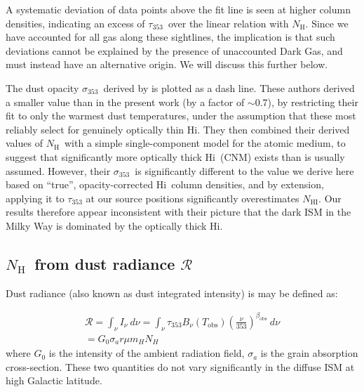 \documentclass[preprint]{emulateapj}
\def\hi{H{\sc i}}
\def\NHI{$N_\mathrm{HI}$}
\def\NH{$N_\mathrm{H}$}
\def\s{s$^{-1}$}
\def\s353{$\sigma_{353}$}
\def\t353{$\tau_{353}$}
\def\rad{$\mathcal{R}$}
\begin{document}
A systematic deviation of data points above the fit line is seen at higher column densities, indicating an excess of \t353\ over the linear relation with \NH. Since we have accounted for all gas along these sightlines, the implication is that such deviations cannot be explained by the presence of unaccounted Dark Gas, and must instead have an alternative origin. We will discuss this further below.

The dust opacity \s353\ derived by \citet{Fukui2015} is plotted as a dash line. These authors derived a smaller value than in the present work (by a factor of $\sim$0.7), by restricting their fit to only the warmest dust temperatures, under the assumption that these most reliably select for genuinely optically thin \hi. %
They then %
combined their derived values of \NH\ with a simple single-component model for the atomic medium, to suggest that significantly more optically thick \hi\ (CNM) exists than is usually assumed. However, their \s353\ is significantly different to the value we derive here based on ``true'', opacity-corrected \hi\ column densities, and by extension, applying it to \t353 at our source positions significantly overestimates \NHI. Our results therefore appear inconsistent with their picture that the dark ISM in the Milky Way is dominated by the optically thick \hi.

\subsection{ \NH\ from dust radiance \rad}
\label{subsec:nh-from-radiance}
Dust radiance (also known as dust integrated intensity) is may be defined as:

\begin{equation}
\begin{split}
\mathcal{R} = \int_{\nu}^{} I_{\nu}~d\nu = \int_{\nu}^{} \tau_{353}B_{\nu}(T_\mathrm{obs})\left(\frac{\nu}{353}\right)^{\beta_\mathrm{obs}}~d\nu\\
= G_{0}\sigma_{a}r\mu m_{H} N_{H}
\end{split}
\label{eq_r_nh}
\end{equation}
\noindent where $G_{0}$ is the intensity of the ambient radiation field, $\sigma_{a}$ is the grain absorption cross-section. These two quantities do not vary significantly in the diffuse ISM at high Galactic latitude.
\end{document}
